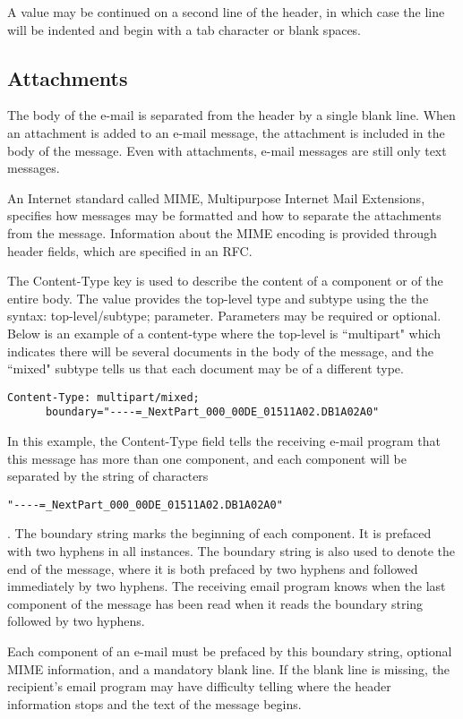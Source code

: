 \documentclass[12pt]{article}
\begin{document}
A value may be continued on a second line of the header, in which
case the line will be indented and begin with a tab character or
blank spaces.

\subsection*{Attachments}

The body of the e-mail is separated from the header by a single
blank line. 
When an attachment is added to an e-mail message, the attachment
is included in the body of the message. 
Even with attachments, e-mail messages are still only
text messages. 

An Internet standard called MIME, 
Multipurpose Internet Mail Extensions, 
specifies how messages may be formatted and how to separate 
the attachments from the message. 
Information about the MIME encoding is provided through header fields, 
which are specified in an RFC. 

The Content-Type key is used to describe the content of a component
or of the entire body. 
The value provides the top-level type and subtype using the 
the syntax:  top-level/subtype; parameter.
Parameters may be required or optional.
Below is an example of a content-type where the 
top-level is ``multipart" which indicates there will be several 
documents in the body of the message, and the ``mixed" subtype  tells
us that each document may be of a different type.

\begin{verbatim}
Content-Type: multipart/mixed;
      boundary="----=_NextPart_000_00DE_01511A02.DB1A02A0"
\end{verbatim}

In this example, the Content-Type field tells the receiving e-mail program 
that this message has more than one component, and each component will be 
separated by the string of characters 
\begin{verbatim}"----=_NextPart_000_00DE_01511A02.DB1A02A0"\end{verbatim}.
The boundary string marks the beginning of each component.
It is prefaced with two hyphens in all instances.
The boundary string is also used to denote the end of the message, 
where it is both prefaced by two hyphens and followed immediately by two 
hyphens. 
The receiving email program knows when the last component of the message
has been read when it reads the boundary string followed by two hyphens.

Each component of an e-mail must be prefaced by this 
boundary string, optional MIME information, and a mandatory blank line. 
If the blank line is missing, the recipient's email program may have 
difficulty telling where the header information stops and the text of the 
message begins.
\end{document}
